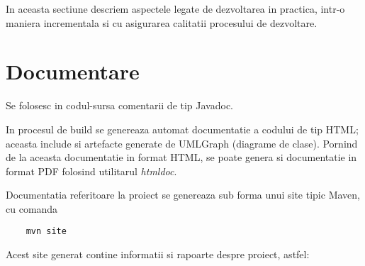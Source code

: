 In aceasta sectiune descriem aspectele legate de dezvoltarea in practica, intr-o
maniera incrementala si cu asigurarea calitatii procesului de dezvoltare.

\section{Documentare}
Se folosesc in codul-sursa comentarii de tip Javadoc. 

In procesul de build se genereaza automat documentatie a codului de tip HTML; 
aceasta include si artefacte generate de UMLGraph (diagrame de clase).
Pornind de la aceasta documentatie in format HTML, se poate genera si documentatie in format PDF 
folosind utilitarul \emph{htmldoc}.

Documentatia referitoare la proiect se genereaza sub forma unui site tipic Maven, cu comanda
\begin{lstlisting}
	mvn site
\end{lstlisting}
Acest site generat contine informatii si rapoarte despre proiect, astfel:
